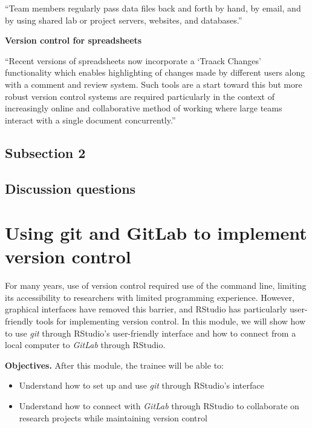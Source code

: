 \documentclass[]{tufte-book}
\providecommand{\tightlist}{%
  \setlength{\itemsep}{0pt}\setlength{\parskip}{0pt}}
\begin{document}
``Team members regularly pass data files back and forth by hand, by email, and by
using shared lab or project servers, websites, and databases.''
\citep{edwards2011science}

\textbf{Version control for spreadsheets}

``Recent versions of spreadsheets now incorporate a `Traack Changes' functionality
which enables highlighting of changes made by different users along with a comment
and review system. Such tools are a start toward this but more robust version control
systems are required particularly in the context of increasingly online and
collaborative method of working where large teams interact with a single document
concurrently.'' \citep{birch2018future}

\hypertarget{subsection-2-4}{%
\subsection{Subsection 2}\label{subsection-2-4}}

\hypertarget{discussion-questions-4}{%
\subsection{Discussion questions}\label{discussion-questions-4}}

\hypertarget{using-git-and-gitlab-to-implement-version-control}{%
\section{Using git and GitLab to implement version control}\label{using-git-and-gitlab-to-implement-version-control}}

For many years, use of version control required use of the command line,
limiting its accessibility to researchers with limited programming experience.
However, graphical interfaces have removed this barrier, and RStudio has
particularly user-friendly tools for implementing version control. In this
module, we will show how to use \emph{git} through RStudio's user-friendly
interface and how to connect from a local computer to \emph{GitLab} through
RStudio.

\textbf{Objectives.} After this module, the trainee will be able to:

\begin{itemize}
\tightlist
\item
  Understand how to set up and use \emph{git} through RStudio's interface
\item
  Understand how to connect with \emph{GitLab} through RStudio to collaborate on\\
  research projects while maintaining version control
\end{itemize}
\end{document}
